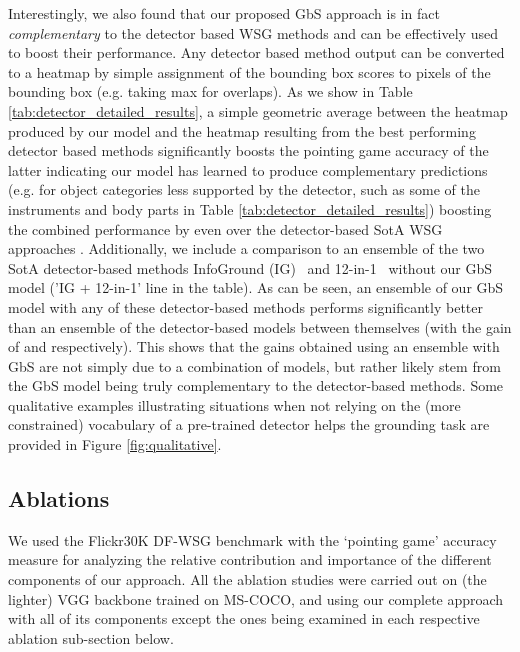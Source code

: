 \documentclass[10pt,twocolumn,letterpaper]{article}
\def\oursspace{{GbS }}
\def\ourstask{DF-WSG}
\newcommand\secvspace{\vspace{-0.0cm}}
\begin{document}
Interestingly, we also found that our proposed \oursspace approach is in fact \textit{complementary} to the detector based WSG methods and can be effectively used to boost their performance. Any detector based method output can be converted to a heatmap by simple assignment of the bounding box scores to pixels of the bounding box (e.g. taking max for overlaps). As we show in Table \ref{tab:detector_detailed_results}, a simple geometric average between the heatmap produced by our model and the heatmap resulting from the best performing detector based methods significantly boosts the pointing game accuracy of the latter indicating our model has learned to produce complementary predictions (e.g. for object categories less supported by the detector, such as some of the instruments and body parts in Table \ref{tab:detector_detailed_results}) boosting the combined performance by  even over the detector-based SotA WSG approaches \cite{datta2019align2ground, gupta2020contrastive,lu202012}. 
Additionally, we include a comparison to an ensemble of the two SotA detector-based methods InfoGround (IG)~\cite{gupta2020contrastive} and 12-in-1~\cite{lu202012} without our \oursspace model ('IG + 12-in-1' line in the table). As can be seen, an ensemble of our \oursspace model with any of these detector-based methods performs significantly better than an ensemble of the detector-based models between themselves (with the gain of  and  respectively). This shows that the gains obtained using an ensemble with \oursspace are not simply due to a combination of models, but rather likely stem from the \oursspace model being truly complementary to the detector-based methods.
Some qualitative examples illustrating situations when not relying on the (more constrained) vocabulary of a pre-trained detector helps the grounding task are provided in Figure \ref{fig:qualitative}. \secvspace
\subsection{Ablations}\label{sec:ablations}
\secvspace
We used the Flickr30K \ourstask{} benchmark \cite{plummer2015flickr30k} with the `pointing game' accuracy measure \cite{zhang2016top} for analyzing the relative contribution and importance of the different components of our \ours{} approach. All the ablation studies were carried out on (the lighter) VGG backbone trained on MS-COCO, and using our complete \ours{} approach with all of its components except the ones being examined in each respective ablation sub-section below.
\end{document}
